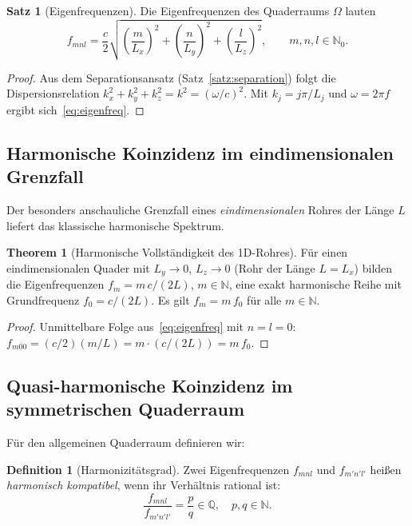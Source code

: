 ﻿\documentclass[12pt, a4paper]{article}
\theoremstyle{definition}
\newtheorem{definition}{Definition}[section]
\newtheorem{satz}{Satz}[section]
\newtheorem{theorem}{Theorem}[section]
\theoremstyle{remark}
\newcommand{\N}{\mathbb{N}}
\newcommand{\Lx}{L_x}
\newcommand{\Ly}{L_y}
\newcommand{\Lz}{L_z}
\begin{document}
\begin{satz}[Eigenfrequenzen]
\label{satz:eigenfreq}
Die Eigenfrequenzen des Quaderraums $\Omega$ lauten
\begin{equation}
  f_{mnl} = \frac{c}{2}\sqrt{\left(\frac{m}{\Lx}\right)^2
  + \left(\frac{n}{\Ly}\right)^2
  + \left(\frac{l}{\Lz}\right)^2},
  \qquad m,n,l \in \N_0.
  \label{eq:eigenfreq}
\end{equation}
\end{satz}

\begin{proof}
Aus dem Separationsansatz (Satz~\ref{satz:separation}) folgt die
Dispersionsrelation $k_x^2 + k_y^2 + k_z^2 = k^2 = (\omega/c)^2$.
Mit $k_j = j\pi/L_j$ und $\omega = 2\pi f$ ergibt sich~\eqref{eq:eigenfreq}. 
\end{proof}

\subsection{Harmonische Koinzidenz im eindimensionalen Grenzfall}

Der besonders anschauliche Grenzfall eines \emph{eindimensionalen} Rohres
der Länge $L$ liefert das klassische harmonische Spektrum.

\begin{theorem}[Harmonische Vollständigkeit des 1D-Rohres]
\label{thm:harmonie_1d}
Für einen eindimensionalen Quader mit $\Ly \to 0$, $\Lz \to 0$ (Rohr
der Länge $L = \Lx$) bilden die Eigenfrequenzen
$f_m = m\,c/(2L)$, $m \in \N$, eine exakt harmonische Reihe mit
Grundfrequenz $f_0 = c/(2L)$. Es gilt $f_m = m\,f_0$ für alle $m \in \N$.
\end{theorem}

\begin{proof}
Unmittelbare Folge aus~\eqref{eq:eigenfreq} mit $n = l = 0$:
$f_{m00} = (c/2)(m/L) = m \cdot (c/(2L)) = m\,f_0$. 
\end{proof}

\subsection{Quasi-harmonische Koinzidenz im symmetrischen Quaderraum}

Für den allgemeinen Quaderraum definieren wir:

\begin{definition}[Harmonizitätsgrad]
\label{def:harm_grad}
Zwei Eigenfrequenzen $f_{mnl}$ und $f_{m'n'l'}$ heißen \emph{harmonisch
kompatibel}, wenn ihr Verhältnis rational ist:
\[
  \frac{f_{mnl}}{f_{m'n'l'}} = \frac{p}{q} \in \mathbb{Q}, \quad p,q \in \N.
\]
\end{definition}
\end{document}

